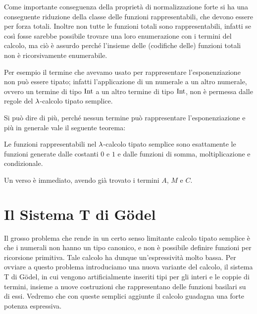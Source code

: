 \documentclass[]{marticle}
\begin{document}
Come importante conseguenza della propriet\`a di normalizzazione forte si ha una
conseguente riduzione della classe delle funzioni rappresentabili, che devono
essere per forza totali. Inoltre non tutte le funzioni totali sono
rappresentabili, infatti se cos\`i fosse sarebbe possibile trovare una loro
enumerazione con i termini del calcolo, ma ci\`o \`e assurdo perch\'e l'insieme
delle (codifiche delle) funzioni totali non \`e ricorsivamente enumerabile.

Per esempio il termine che avevamo usato per rappresentare l'esponenziazione non
pu\`o essere tipato; infatti l'applicazione di un numerale a un altro numerale,
ovvero un termine di tipo $\text{Int}$ a un altro termine di tipo $\text{Int}$, non \`e
permessa dalle regole del $\lambda$-calcolo tipato semplice.

Si pu\`o dire di pi\`u, perch\'e nessun termine pu\`o rappresentare
l'esponenziazione e pi\`u in generale vale il seguente teorema:

\begin{block}[Teorema]
    Le funzioni rappresentabili nel $\lambda$-calcolo tipato semplice sono
    esattamente le funzioni generate dalle costanti $0$ e $1$ e dalle funzioni
    di somma, moltiplicazione e condizionale.
\end{block}

Un verso \`e immediato, avendo gi\`a trovato i termini $A$, $M$ e $C$.

\section{Il Sistema T di G\"odel}

Il grosso problema che rende in un certo senso limitante calcolo tipato semplice
\`e che i numerali non hanno un tipo canonico, e non \`e possibile definire
funzioni per ricorsione primitiva.  Tale calcolo ha dunque un'espressivit\`a
molto bassa.  Per ovviare a questo problema introduciamo una nuova variante del
calcolo, il sistema T di G\"odel, in cui vengono artificialmente inseriti tipi
per gli interi e le coppie di termini, insieme a nuove costruzioni che
rappresentano delle funzioni basilari su di essi.  Vedremo che con queste
semplici aggiunte il calcolo guadagna una forte potenza espressiva.
\end{document}
